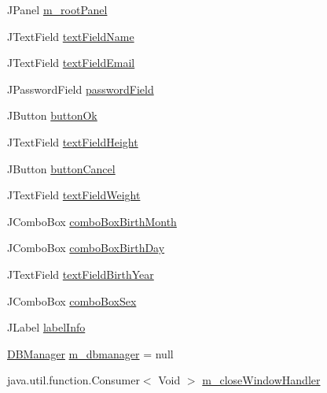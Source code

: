 \begin{DoxyCompactItemize}
\item 
J\+Panel \mbox{\hyperlink{classcom_1_1activitytracker_1_1_create_user_window_a5a678326afe519b6a2c9e7a2d9eff87c}{m\+\_\+root\+Panel}}
\item 
J\+Text\+Field \mbox{\hyperlink{classcom_1_1activitytracker_1_1_create_user_window_aa2b8cf1781a8a1534dbf5c5b98332c05}{text\+Field\+Name}}
\item 
J\+Text\+Field \mbox{\hyperlink{classcom_1_1activitytracker_1_1_create_user_window_a4f6010631cb7be5a2ae3691bdca31483}{text\+Field\+Email}}
\item 
J\+Password\+Field \mbox{\hyperlink{classcom_1_1activitytracker_1_1_create_user_window_a29be9c267c003ae90731199d8257dc0a}{password\+Field}}
\item 
J\+Button \mbox{\hyperlink{classcom_1_1activitytracker_1_1_create_user_window_aa22864c8baa65b46fe9a7621748d7841}{button\+Ok}}
\item 
J\+Text\+Field \mbox{\hyperlink{classcom_1_1activitytracker_1_1_create_user_window_ac5ce2bc2efbc06d578d93fb3f26aad1c}{text\+Field\+Height}}
\item 
J\+Button \mbox{\hyperlink{classcom_1_1activitytracker_1_1_create_user_window_a975a5cc35d145a3efa4d9e340776ca63}{button\+Cancel}}
\item 
J\+Text\+Field \mbox{\hyperlink{classcom_1_1activitytracker_1_1_create_user_window_ae84b4d977150419bfabc11fbd009392c}{text\+Field\+Weight}}
\item 
J\+Combo\+Box \mbox{\hyperlink{classcom_1_1activitytracker_1_1_create_user_window_acb63cb981ace7286e1712938ce2ffc58}{combo\+Box\+Birth\+Month}}
\item 
J\+Combo\+Box \mbox{\hyperlink{classcom_1_1activitytracker_1_1_create_user_window_a9b5d614cb11ff1bd1bf789ec6e72757f}{combo\+Box\+Birth\+Day}}
\item 
J\+Text\+Field \mbox{\hyperlink{classcom_1_1activitytracker_1_1_create_user_window_a4a0980af9377429dcb012507bc1ed3b9}{text\+Field\+Birth\+Year}}
\item 
J\+Combo\+Box \mbox{\hyperlink{classcom_1_1activitytracker_1_1_create_user_window_a62e1c71627dc29c17bdffe73794f91f7}{combo\+Box\+Sex}}
\item 
J\+Label \mbox{\hyperlink{classcom_1_1activitytracker_1_1_create_user_window_a09fb943f56852bc4a8dbd32b7dbe8afc}{label\+Info}}
\item 
\mbox{\hyperlink{classcom_1_1activitytracker_1_1_d_b_manager}{D\+B\+Manager}} \mbox{\hyperlink{classcom_1_1activitytracker_1_1_create_user_window_adab0a80c7975dfad1c2882a56f00a235}{m\+\_\+dbmanager}} = null
\item 
java.\+util.\+function.\+Consumer$<$ Void $>$ \mbox{\hyperlink{classcom_1_1activitytracker_1_1_create_user_window_a8fd1d7fb3c2f1913d2c44fd1d475a20a}{m\+\_\+close\+Window\+Handler}}
\end{DoxyCompactItemize}


